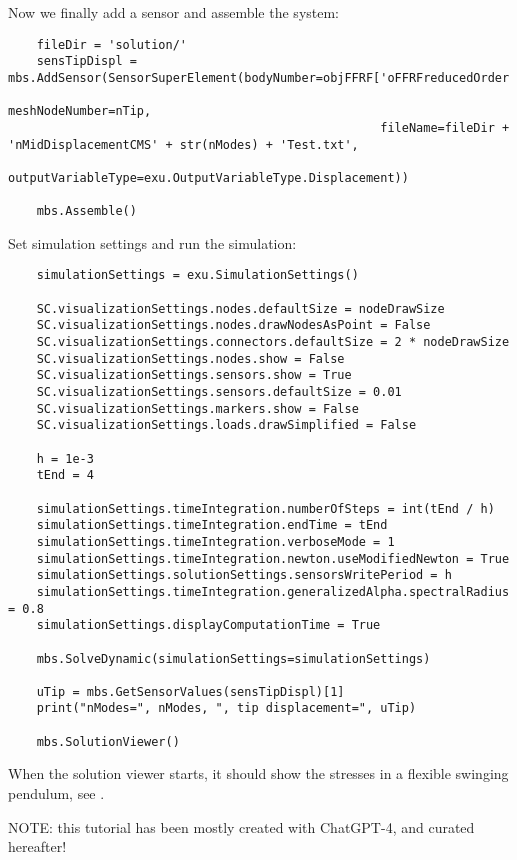 \noindent Now we finally add a sensor and assemble the system:
\pythonstyle\begin{lstlisting}
    fileDir = 'solution/'
    sensTipDispl = mbs.AddSensor(SensorSuperElement(bodyNumber=objFFRF['oFFRFreducedOrder'], 
                                                    meshNodeNumber=nTip, 
                                                    fileName=fileDir + 'nMidDisplacementCMS' + str(nModes) + 'Test.txt', 
                                                    outputVariableType=exu.OutputVariableType.Displacement))

    mbs.Assemble()
\end{lstlisting}
%
Set simulation settings and run the simulation:
\pythonstyle\begin{lstlisting}
    simulationSettings = exu.SimulationSettings()

    SC.visualizationSettings.nodes.defaultSize = nodeDrawSize
    SC.visualizationSettings.nodes.drawNodesAsPoint = False
    SC.visualizationSettings.connectors.defaultSize = 2 * nodeDrawSize
    SC.visualizationSettings.nodes.show = False
    SC.visualizationSettings.sensors.show = True
    SC.visualizationSettings.sensors.defaultSize = 0.01
    SC.visualizationSettings.markers.show = False
    SC.visualizationSettings.loads.drawSimplified = False

    h = 1e-3
    tEnd = 4

    simulationSettings.timeIntegration.numberOfSteps = int(tEnd / h)
    simulationSettings.timeIntegration.endTime = tEnd
    simulationSettings.timeIntegration.verboseMode = 1
    simulationSettings.timeIntegration.newton.useModifiedNewton = True
    simulationSettings.solutionSettings.sensorsWritePeriod = h
    simulationSettings.timeIntegration.generalizedAlpha.spectralRadius = 0.8
    simulationSettings.displayComputationTime = True

    mbs.SolveDynamic(simulationSettings=simulationSettings)

    uTip = mbs.GetSensorValues(sensTipDispl)[1]
    print("nModes=", nModes, ", tip displacement=", uTip)

    mbs.SolutionViewer()
\end{lstlisting}
When the solution viewer starts, it should show the stresses in a flexible swinging pendulum, see .


NOTE: this tutorial has been mostly created with ChatGPT-4, and curated hereafter!
